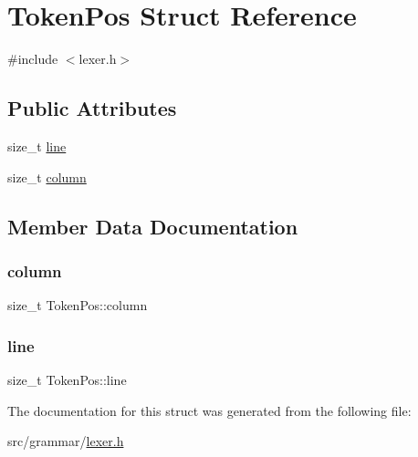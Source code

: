 \hypertarget{structTokenPos}{}\section{Token\+Pos Struct Reference}
\label{structTokenPos}


{\ttfamily \#include $<$lexer.\+h$>$}

\subsection*{Public Attributes}
\begin{DoxyCompactItemize}
\item 
size\+\_\+t \hyperlink{structTokenPos_a22e96ecce72e43d54be9f8659c9457d2}{line}
\item 
size\+\_\+t \hyperlink{structTokenPos_a5334ad1b26a25a1e25ace72091f30ee1}{column}
\end{DoxyCompactItemize}


\subsection{Member Data Documentation}
\hypertarget{structTokenPos_a5334ad1b26a25a1e25ace72091f30ee1}{}\label{structTokenPos_a5334ad1b26a25a1e25ace72091f30ee1} 
\subsubsection{\texorpdfstring{column}{column}}
{\footnotesize\ttfamily size\+\_\+t Token\+Pos\+::column}

\hypertarget{structTokenPos_a22e96ecce72e43d54be9f8659c9457d2}{}\label{structTokenPos_a22e96ecce72e43d54be9f8659c9457d2} 
\subsubsection{\texorpdfstring{line}{line}}
{\footnotesize\ttfamily size\+\_\+t Token\+Pos\+::line}



The documentation for this struct was generated from the following file\+:\begin{DoxyCompactItemize}
\item 
src/grammar/\hyperlink{lexer_8h}{lexer.\+h}\end{DoxyCompactItemize}
